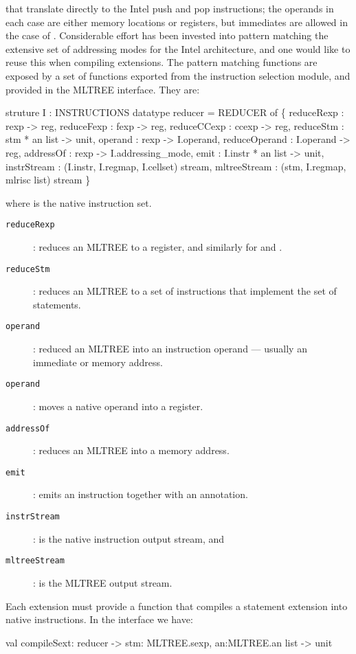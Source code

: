 that translate directly to the Intel push and pop instructions; the
operands in each case are either memory locations or registers, but
immediates are allowed in the case of . Considerable effort 
has been invested into pattern matching the extensive set of
addressing modes for the Intel architecture, and
one would like to reuse this when compiling extensions. The pattern
matching functions are exposed by a set of functions exported from the 
instruction selection module, and provided in the MLTREE
interface. They are: 

\begin{SML}
  struture I : INSTRUCTIONS
  datatype reducer = 
    REDUCER of \{
      reduceRexp    : rexp -> reg,
      reduceFexp    : fexp -> reg,
      reduceCCexp   : ccexp -> reg,
      reduceStm     : stm * an list -> unit,
      operand       : rexp -> I.operand,
      reduceOperand : I.operand -> reg,
      addressOf     : rexp -> I.addressing_mode,
      emit          : I.instr * an list -> unit,
      instrStream   : (I.instr, I.regmap, I.cellset) stream,
      mltreeStream  : (stm, I.regmap, mlrisc list) stream
    \}
\end{SML}

where  is the native instruction set. 
\begin{description}
\item[\tt reduceRexp]: reduces an MLTREE  to a register, and
	similarly for  and .
\item[\tt reduceStm]: reduces an MLTREE  to a set of instructions
	that implement the set of statements.
\item[\tt operand]: reduced an MLTREE  into an instruction
operand --- usually an immediate or memory address.
\item[\tt operand]: moves a native operand into a register.
\item[\tt addressOf]: reduces an MLTREE  into a memory address.
\item[\tt emit]: emits an instruction together with an annotation.
\item[\tt instrStream]: is the native instruction output stream, and
\item[\tt mltreeStream]: is the MLTREE output stream.
\end{description}

Each extension must provide a function  that compiles
a statement extension into native instructions. In the
 interface we have:
\begin{SML}
  val compileSext: reducer -> {stm: MLTREE.sexp, an:MLTREE.an list} -> unit
\end{SML}

